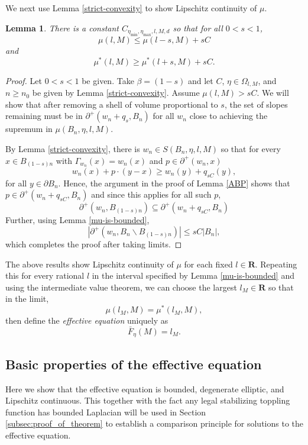 \documentclass[12pt]{amsart}
\newcommand{\R}{\mathbf{R}}
\newtheorem{lemma}[theorem]{Lemma}
\begin{document}
We next use Lemma \ref{strict-convexity} to show Lipschitz continuity of $\mu$.
\begin{lemma}\label{continuity} 
There is a constant $C_{\eta_{\min}, \eta_{\max}, l, M, d}$ so that for all $0 < s < 1$,
\[
\mu(l, M) \leq  \mu(l-s, M)+  s C
\]
and
\[
\mu^*(l,M) \geq \mu^*(l+s,M) + sC. 
\]
\end{lemma}

\begin{proof}
Let $0 < s < 1$ be given. Take $\beta = (1-s)$ and let $C$, $\eta \in \Omega_{l,M}$, and $n \geq n_0$ be given by Lemma \ref{strict-convexity}. Assume $\mu(l,M) > s C$. We will show that after removing a shell of volume proportional to $s$, the set of slopes remaining must be in $\partial^+(w_n + q_s, B_n)$ for all $w_n$ close to achieving the supremum in  $\mu(B_{n}, \eta, l, M)$.

By Lemma \ref{strict-convexity}, there is $w_n \in S(B_{n}, \eta, l, M)$ so that for every $x \in B_{(1-s) n}$ with $\Gamma_{w_n}(x) = w_n(x)$ 
and $p \in \partial^+(w_n, x)$ 
\begin{equation}
w_n(x) + p \cdot(y -x)  \geq w_n(y) + q_{s C}(y), 
\end{equation}
for all $y \in \partial B_{n}$. 
Hence, the argument in the proof of Lemma \ref{ABP} shows that $p \in \partial^+(w_n + q_{s C},B_n)$
and since this applies for all such $p$, 
\[
\partial^+(w_n, B_{(1-s)n}) \subseteq \partial^+(w_n + q_{sC}, B_n) 
\]
Further, using Lemma \ref{mu-is-bounded}, 
\[
|\partial^+(w_n, B_n \backslash B_{(1-s)n})| \leq   s C |B_n|, 
\]
which completes the proof after taking limits.
\end{proof}

The above results show Lipschitz continuity of $\mu$ for each fixed $l \in \R$. Repeating this for every rational $l$ 
in the interval specified by Lemma \ref{mu-is-bounded} and using the intermediate value theorem, we can choose the largest $l_M \in \R$ so that in the limit, 
\[
\mu(l_M, M) = \mu^*(l_M,M),
\]
then define the {\it effective equation} uniquely as
\[
\bar{F}_{\eta}(M) = l_M. 
\]

\subsection{Basic properties of the effective equation}

Here we show that the effective equation is bounded, degenerate elliptic, and Lipschitz continuous. This together with 
the fact any legal stabilizing toppling function has bounded Laplacian will be used in Section \ref{subsec:proof_of_theorem} to establish a comparison principle for solutions to the effective equation. 
\end{document}
